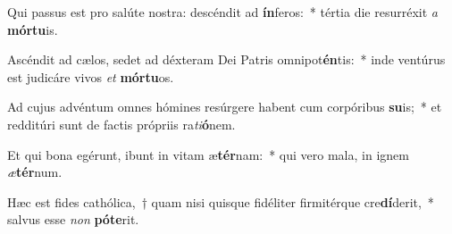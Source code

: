 \item Qui passus est pro salúte nostra: descéndit ad \textbf{ín}feros:~* tértia die resurréxit \textit{a} \textbf{mór}\textbf{tu}is.
\item Ascéndit ad cælos, sedet ad déxteram Dei Patris omnipot\textbf{én}tis:~* inde ventúrus est judicáre vivos \textit{et} \textbf{mór}\textbf{tu}os.
\item Ad cujus advéntum omnes hómines resúrgere habent cum corpóribus \textbf{su}is;~* et redditúri sunt de factis própriis ra\textit{ti}\textbf{ó}nem.
\item Et qui bona egérunt, ibunt in vitam æ\textbf{tér}nam:~* qui vero mala, in ignem \textit{æ}\textbf{tér}num.
\item Hæc est fides cathólica,~† quam nisi quisque fidéliter firmitérque cre\textbf{dí}derit,~* salvus esse \textit{non} \textbf{pót}\textbf{e}rit.
